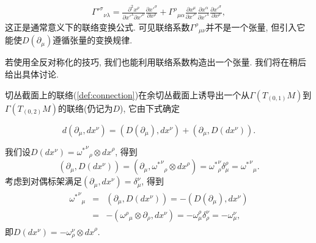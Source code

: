 \begin{eqnarray}
  {{\varGamma'}^\sigma}_{\nu\lambda}=\frac{\partial^2{x^\rho}}{\partial{x'}^\lambda\partial{x'}^\nu}\frac{\partial{{x'}^\sigma}}{\partial{x^\rho}}+{\varGamma^\rho}_{\mu\alpha}\frac{\partial{x^\mu}}{\partial{x'}^\nu}\frac{\partial{x}^\alpha}{\partial{x'}^\lambda}\frac{\partial{{x'}^\sigma}}{\partial{x^\rho}},
\end{eqnarray}
这正是通常意义下的联络变换公式. 可见联络系数${\varGamma^\rho}_{\mu\nu}$并不是一个张量, 但引入它能使$D(\partial_\mu)$遵循张量的变换规律.

\begin{remark}
若使用全反对称化的技巧, 我们也能利用联络系数构造出一个张量. 我们将在稍后给出具体讨论.
\end{remark}

切丛截面上的联络(\ref{def:connection})在余切丛截面上诱导出一个从$\varGamma(T_{(0, 1)}M)$到$\varGamma(T_{(0, 2)}M)$的联络(仍记为$D$), 它由下式确定

$$d\left(\partial_\mu, dx^\nu\right)=\left(D(\partial_\mu), dx^\nu\right)+\left(\partial_\mu, D(dx^\nu)\right).$$

我们设$D(dx^\nu)={{\omega^*}^\nu}_\rho\otimes{dx}^\rho$, 得到
$$\left(\partial_\mu, D(dx^\nu)\right)=\left(\partial_\mu, {{\omega^*}^\nu}_\rho\otimes{dx}^\rho\right)={\omega^*}^\nu_\rho\delta^\rho_\mu={{\omega^*}^\nu}_\mu. $$
考虑到对偶标架满足$\left(\partial_\mu, dx^\nu\right)=\delta^\nu_\mu$, 得到
\begin{eqnarray}
  \begin{aligned}
    {{\omega^*}^\nu}_\mu&=&\left(\partial_\mu, D(dx^\nu)\right)=-\left(D(\partial_\mu), dx^\nu\right)\\
    &=&-\left({\omega^\rho}_\mu\otimes\partial_\rho, dx^\nu\right)=-{\omega}^\rho_\mu\delta^\nu_\rho=-{\omega}^\nu_\mu,
  \end{aligned}
\end{eqnarray}
即$D(dx^\nu)=-{\omega}^\nu_\rho\otimes{dx}^\rho$.

